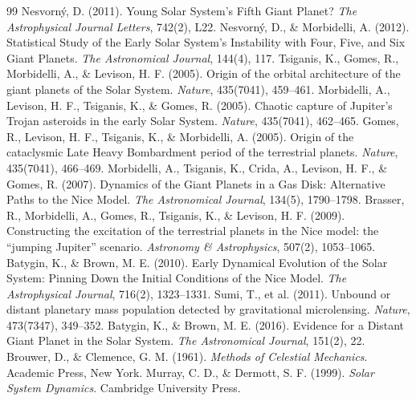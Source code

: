 \documentclass[11pt,a4paper]{article}
\begin{document}
\begin{thebibliography}{99}
 Nesvorn\'y, D. (2011). Young Solar System's Fifth Giant Planet? \textit{The Astrophysical Journal Letters}, 742(2), L22.
 Nesvorn\'y, D., \& Morbidelli, A. (2012). Statistical Study of the Early Solar System's Instability with Four, Five, and Six Giant Planets. \textit{The Astronomical Journal}, 144(4), 117.
 Tsiganis, K., Gomes, R., Morbidelli, A., \& Levison, H. F. (2005). Origin of the orbital architecture of the giant planets of the Solar System. \textit{Nature}, 435(7041), 459--461.
 Morbidelli, A., Levison, H. F., Tsiganis, K., \& Gomes, R. (2005). Chaotic capture of Jupiter's Trojan asteroids in the early Solar System. \textit{Nature}, 435(7041), 462--465.
 Gomes, R., Levison, H. F., Tsiganis, K., \& Morbidelli, A. (2005). Origin of the cataclysmic Late Heavy Bombardment period of the terrestrial planets. \textit{Nature}, 435(7041), 466--469.
 Morbidelli, A., Tsiganis, K., Crida, A., Levison, H. F., \& Gomes, R. (2007). Dynamics of the Giant Planets in a Gas Disk: Alternative Paths to the Nice Model. \textit{The Astronomical Journal}, 134(5), 1790--1798.
 Brasser, R., Morbidelli, A., Gomes, R., Tsiganis, K., \& Levison, H. F. (2009). Constructing the excitation of the terrestrial planets in the Nice model: the ``jumping Jupiter'' scenario. \textit{Astronomy \& Astrophysics}, 507(2), 1053--1065.
 Batygin, K., \& Brown, M. E. (2010). Early Dynamical Evolution of the Solar System: Pinning Down the Initial Conditions of the Nice Model. \textit{The Astrophysical Journal}, 716(2), 1323--1331.
 Sumi, T., et al. (2011). Unbound or distant planetary mass population detected by gravitational microlensing. \textit{Nature}, 473(7347), 349--352.
 Batygin, K., \& Brown, M. E. (2016). Evidence for a Distant Giant Planet in the Solar System. \textit{The Astronomical Journal}, 151(2), 22.
 Brouwer, D., \& Clemence, G. M. (1961). \textit{Methods of Celestial Mechanics}. Academic Press, New York.
 Murray, C. D., \& Dermott, S. F. (1999). \textit{Solar System Dynamics}. Cambridge University Press.
\end{thebibliography}
\end{document}

